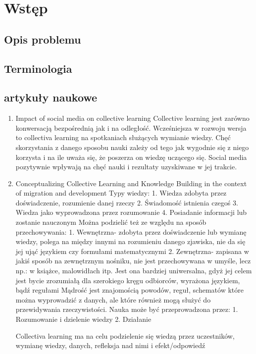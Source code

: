 \documentclass[11pt]{aghdpl}
\author{Mateusz Grzeliński, Kornel Wilk, Mateusz Szymkowski}
\date{2018}
\begin{document}
\titlepages

{
        \fancyhf{}
        \renewcommand{\headrulewidth}{0pt}
        \renewcommand{\footrulewidth}{0pt}
}

\setcounter{tocdepth}{2}
\tableofcontents
\clearpage

\chapter{Wstęp}
\section{Opis problemu}

\section{Terminologia}

\section{artykuły naukowe}
\begin{enumerate}
\item Impact of social media on collective learning
Collective learning jest zarówno konwersacją bezpośrednią jak i na odległość.
Wcześniejsza w rozwoju wersja to collectiva learning na spotkaniach służących wymianie wiedzy. Chęć skorzystania z danego sposobu nauki zależy od tego jak wygodnie się z niego korzysta i na ile uważa się, że poszerza on wiedzę uczącego się.
Social media pozytywnie wpływają na chęć nauki i rezultaty uzyskiwane w jej trakcie.
\item Conceptualizing Collective Learning and Knowledge Building in the context of migration and development
Typy wiedzy:
1.	Wiedza zdobyta przez doświadczenie, rozumienie danej rzeczy
2.	Świadomość istnienia czegoś
3.	Wiedza jako wyprowadzona przez rozumowanie
4.	Posiadanie informacji lub zostanie nauczonym
Można podzielić też ze względu na sposób przechowywania:
1.	Wewnętrzna- zdobyta przez doświadczenie lub wymianę wiedzy, polega na między innymi na rozumieniu danego zjawiska, nie da się jej ująć językiem czy formułami matematycznymi
2.	Zewnętrzna- zapisana w jakiś sposób na zewnętrznym nośniku, nie jest przechowywana w umyśle, lecz np.: w książce, malowidłach itp. Jest ona bardziej uniwersalna, gdyż jej celem jest bycie zrozumiałą dla szerokiego kręgu odbiorców, wyrażona językiem, bądź regułami
Mądrość jest znajomością powodów, reguł, schematów które można wyprowadzić z danych, ale które również mogą służyć do przewidywania rzeczywistości.
Nauka może być przeprowadzona przez:
1.	Rozumowanie i dzielenie wiedzy
2.	Działanie

Collectiva learning ma na celu podzielenie się wiedzą przez uczestników, wymianę wiedzy, danych, refleksja nad nimi i efekt/odpowiedź

\end{enumerate}



% 
% 

\printbibliography
\end{document}

